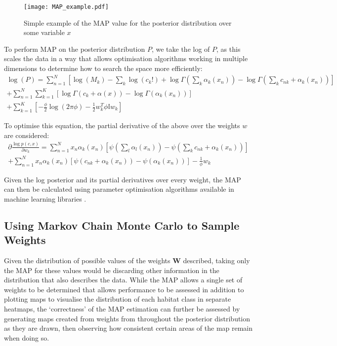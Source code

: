 \begin{figure}
    \texttt{[image: MAP\_example.pdf]}
    \caption{Simple example of the MAP value for the posterior distribution over some variable $x$}
    \label{fig:MAP-ex}
\end{figure}

To perform MAP on the posterior distribution $P$, we take the log of $P$, as this scales the data in a way that allows optimisation algorithms working in multiple dimensions to determine how to search the space more efficiently:
\begin{multline}
    \log(P) = \sum^N_{n=1} [\log(M_k) - \sum_k \log(c_k!) + \log \Gamma(\sum_k \alpha_k(x_n)) - \log \Gamma(\sum_k c_{nk} + \alpha_k(x_n))] \\
    + \sum^N_{n=1} \sum^K_{k=1} [\log \Gamma(c_k + \alpha(x)) - \log \Gamma(\alpha_k(x_n))] \\
    + \sum^K_{k=1} [-\frac{\phi}{2} \log(2\pi \phi) - \frac{1}{2}w_k^T \phi \mathbb{I} w_k]
\end{multline}

To optimise this equation, the partial derivative of the above over the weights $w$ are considered:
\begin{multline}
    \partial \frac{\log p(c, x)}{\partial w_k} = \sum_{n=1}^N x_n \alpha_k (x_n) [\psi(\sum_l \alpha_l(x_n)) - \psi(\sum_k c_{nk} + \alpha_k(x_n))] \\
    + \sum^N_{n=1} x_n \alpha_k (x_n) [\psi (c_{nk} + \alpha_k(x_n)) - \psi(\alpha_k(x_n))] - \frac{1}{\phi} w_k
\end{multline}


Given the log posterior and its partial derivatives over every weight, the MAP can then be calculated using parameter optimisation algorithms available in machine learning libraries .

\subsection{Using Markov Chain Monte Carlo to Sample Weights}
Given the distribution of possible values of the weights $\mathbf{W}$ described, taking only the MAP for these values would be discarding other information in the distribution that also describes the data. While the MAP allows a single set of weights to be determined that allows performance to be assessed in addition to plotting maps to visualise the distribution of each habitat class in separate heatmaps, the `correctness' of the MAP estimation can further be assessed by generating maps created from weights from throughout the posterior distribution as they are drawn, then observing how consistent certain areas of the map remain when doing so.


